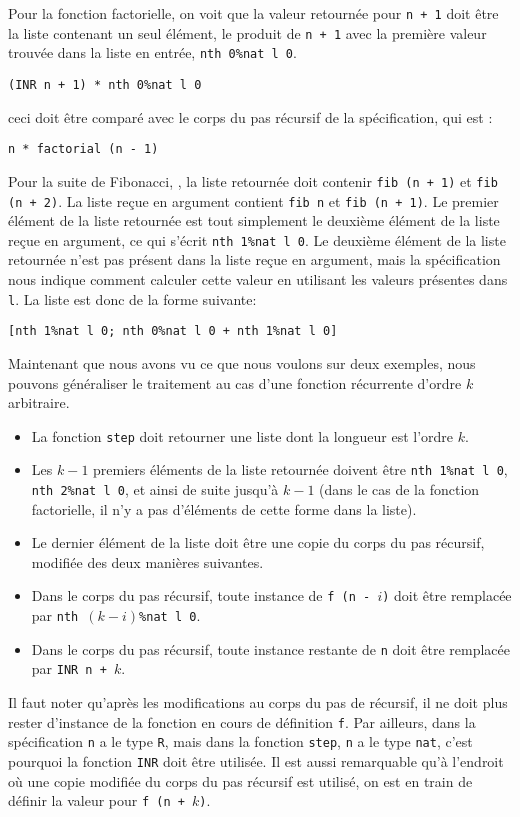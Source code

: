 \documentclass{jflart}
\begin{document}
Pour la fonction factorielle, on voit que la valeur retournée pour
\texttt{n + 1} doit être la liste contenant un seul élément,
le produit de \texttt{n + 1} avec
la première valeur trouvée dans la liste en entrée, \texttt{nth 0\%nat l 0}.
\begin{verbatim}
(INR n + 1) * nth 0%nat l 0
\end{verbatim}
ceci doit être comparé avec le corps du pas récursif de la
spécification, qui est :
\begin{verbatim}
n * factorial (n - 1)
\end{verbatim}

Pour la suite de Fibonacci, , la liste retournée doit
contenir \texttt{fib (n + 1)} et \texttt{fib (n + 2)}.
La liste reçue en argument contient \texttt{fib
    n} et \texttt{fib (n + 1)}.  Le premier
élément de la liste retournée est tout simplement le deuxième élément
de la liste reçue en argument, ce qui s'écrit \texttt{nth 1\%nat l 0}.
Le deuxième élément de la liste retournée n'est pas présent dans la
liste reçue en argument, mais la spécification nous indique comment
calculer cette valeur en utilisant les valeurs présentes dans \texttt{l}.
La liste est donc de la forme suivante:
\begin{verbatim}
[nth 1%nat l 0; nth 0%nat l 0 + nth 1%nat l 0]
\end{verbatim}

Maintenant que nous avons vu ce que nous voulons sur deux exemples,
nous pouvons généraliser le traitement au cas d'une fonction
récurrente d'ordre \(k\) arbitraire.
\begin{itemize}
\item La fonction \texttt{step} doit
retourner une liste dont la longueur est l'ordre \(k\).
\item Les \(k-1\) premiers éléments de la liste retournée doivent
  être \texttt{nth 1\%nat l 0}, \texttt{nth 2\%nat l 0}, et ainsi de suite
jusqu'à \(k - 1\)
  (dans le cas de la fonction factorielle, il n'y a pas d'éléments de
  cette forme dans la liste).
\item Le dernier élément de la liste doit être une copie du corps du
  pas récursif, modifiée des deux manières suivantes.
\item Dans le corps du pas récursif, toute instance de \texttt{f (n -
  \(i\))} doit être remplacée par \texttt{nth \((k - i)\)\%nat l 0}.
\item Dans le corps du pas récursif, toute instance restante de \texttt{n} doit
  être remplacée par \texttt{INR n + \(k\)}.
\end{itemize}
Il faut noter qu'après les modifications au corps du pas de récursif,
il ne doit plus rester d'instance de la fonction en cours de
définition \texttt{f}.  Par
ailleurs, dans la spécification \texttt{n} a le type \texttt{R}, mais dans
la fonction \texttt{step}, \texttt{n} a le type \texttt{nat}, c'est pourquoi la
fonction \texttt{INR} doit être utilisée.  Il est aussi remarquable qu'à
l'endroit où une copie modifiée du corps du pas récursif est utilisé,
on est en train de
définir la valeur pour \texttt{f (n + \(k\))}.
\end{document}
